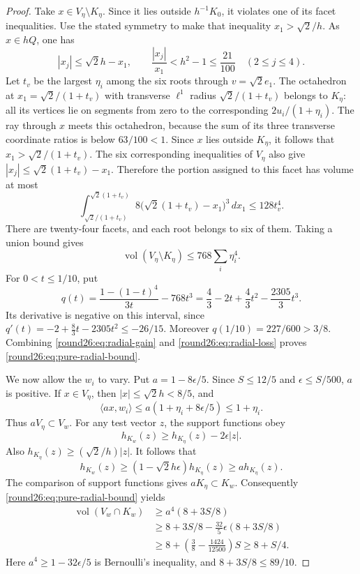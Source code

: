 \begin{proof}
Take $x\in V_\eta\setminus K_\eta$. Since it lies outside
$h^{-1}K_0$, it violates one of its facet inequalities. Use the
stated symmetry to make that inequality $x_1>\sqrt2/h$.
As $x\in hQ$, one has
\[
 |x_j|\le\sqrt2h-x_1,\qquad
 \frac{|x_j|}{x_1}<h^2-1\le\frac{21}{100}\quad(2\le j\le4).
\]
Let $t_v$ be the largest $\eta_i$ among the six roots through
$v=\sqrt2e_1$. The octahedron at
$x_1=\sqrt2/(1+t_v)$ with transverse $\ell^1$ radius
$\sqrt2/(1+t_v)$ belongs to $K_\eta$: all its vertices lie on
segments from zero to the corresponding $2u_i/(1+\eta_i)$.
The ray through $x$ meets this octahedron, because the sum of
its three transverse coordinate ratios is below $63/100<1$.
Since $x$ lies outside $K_\eta$, it follows that
$x_1>\sqrt2/(1+t_v)$.
The six corresponding inequalities of $V_\eta$ also give
$|x_j|\le\sqrt2(1+t_v)-x_1$. Therefore the portion assigned to
this facet has volume at most
\[
 \int_{\sqrt2/(1+t_v)}^{\sqrt2(1+t_v)}
      8\bigl(\sqrt2(1+t_v)-x_1\bigr)^3\,dx_1
 \le128t_v^4.
\]
There are twenty-four facets, and each root belongs to six of
them. Taking a union bound gives
\begin{equation}\label{round26:eq:radial-loss}
 \operatorname{vol}(V_\eta\setminus K_\eta)
 \le768\sum_i\eta_i^4.
\end{equation}
For $0<t\le1/10$, put
\[
 q(t)=\frac{1-(1-t)^4}{3t}-768t^3
 =\frac43-2t+\frac43t^2-\frac{2305}{3}t^3.
\]
Its derivative is negative on this interval, since
$q'(t)=-2+\frac83t-2305t^2\le-26/15$.
Moreover $q(1/10)=227/600>3/8$.
Combining \eqref{round26:eq:radial-gain} and \eqref{round26:eq:radial-loss}
proves \eqref{round26:eq:pure-radial-bound}.

We now allow the $w_i$ to vary. Put $a=1-8\epsilon/5$.
Since $S\le12/5$ and $\epsilon\le S/500$, $a$ is positive.
If $x\in V_\eta$, then $|x|\le\sqrt2h<8/5$, and
\[
 \langle ax,w_i\rangle
 \le a(1+\eta_i+8\epsilon/5)\le1+\eta_i.
\]
Thus $aV_\eta\subset V_w$.
For any test vector $z$, the support functions obey
\[
 h_{K_w}(z)\ge h_{K_\eta}(z)-2\epsilon|z|.
\]
Also $h_{K_\eta}(z)\ge(\sqrt2/h)|z|$. It follows that
\[
 h_{K_w}(z)\ge(1-\sqrt2h\epsilon)h_{K_\eta}(z)
 \ge a h_{K_\eta}(z).
\]
The comparison of support functions gives $aK_\eta\subset K_w$.
Consequently \eqref{round26:eq:pure-radial-bound} yields
\begin{align*}
 \operatorname{vol}(V_w\cap K_w)
 &\ge a^4(8+3S/8)\\
 &\ge 8+3S/8-\frac{32}{5}\epsilon(8+3S/8)\\
 &\ge 8+\left(\frac38-\frac{1424}{12500}\right)S
 \ge8+S/4.
\end{align*}
Here $a^4\ge1-32\epsilon/5$ is Bernoulli's inequality, and
$8+3S/8\le89/10$.


\end{proof}
